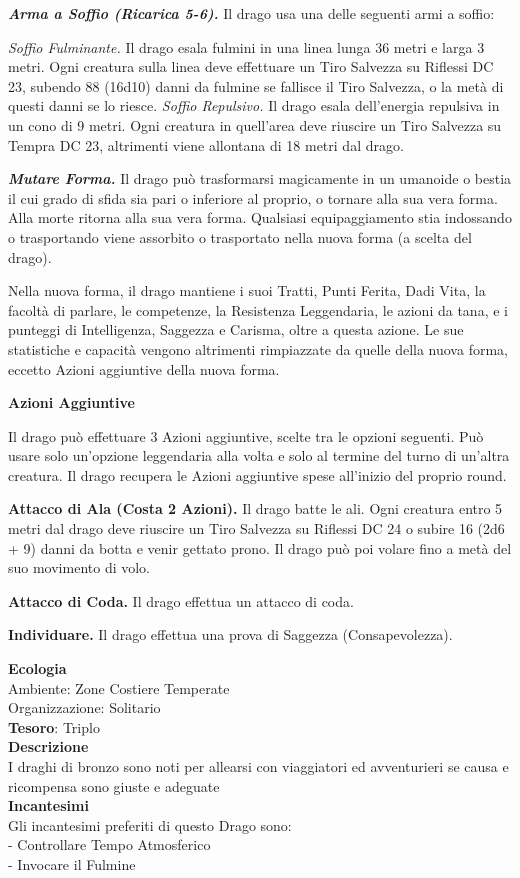 \begin{multicols}{2}
	\textit{\textbf{Arma a Soffio (Ricarica 5-6).}} Il drago usa una delle seguenti armi a soffio:

	\textit{Soffio Fulminante.} Il drago esala fulmini in una linea lunga 36 metri e larga 3 metri. Ogni creatura sulla linea deve effettuare un Tiro Salvezza su Riflessi DC 23, subendo 88 (16d10) danni da fulmine se fallisce il Tiro Salvezza, o la metà di questi danni se lo riesce. \textit{Soffio Repulsivo.} Il drago esala dell'energia repulsiva in un cono di 9 metri. Ogni creatura in quell'area deve riuscire un Tiro Salvezza su Tempra DC 23, altrimenti viene allontana di 18 metri dal
	drago.

	\textit{\textbf{Mutare Forma.}} Il drago può trasformarsi magicamente in un umanoide o bestia il cui grado di sfida sia pari o inferiore al proprio, o tornare alla sua vera forma. Alla morte ritorna alla sua vera forma. Qualsiasi equipaggiamento stia indossando o trasportando viene assorbito o trasportato nella nuova forma (a scelta del drago).

	Nella nuova forma, il drago mantiene i suoi Tratti, Punti Ferita, Dadi Vita, la facoltà di parlare, le competenze, la Resistenza Leggendaria, le azioni da tana, e i punteggi di Intelligenza, Saggezza e Carisma, oltre a questa azione. Le sue statistiche e capacità vengono altrimenti rimpiazzate da quelle della nuova forma, eccetto Azioni aggiuntive della nuova forma.

	\textbf{Azioni Aggiuntive}

	Il drago può effettuare 3 Azioni aggiuntive, scelte tra le opzioni seguenti. Può usare solo un'opzione leggendaria alla volta e solo al termine del turno di un'altra creatura. Il drago recupera le Azioni aggiuntive spese all'inizio del proprio round.

	\textbf{Attacco di Ala (Costa 2 Azioni).} Il drago batte le ali. Ogni creatura entro 5 metri dal drago deve riuscire un Tiro Salvezza su Riflessi DC 24 o subire 16 (2d6 + 9) danni da botta e venir gettato prono. Il drago può poi volare fino a metà del suo movimento di volo.

	\textbf{Attacco di Coda.} Il drago effettua un attacco di coda.

	\textbf{Individuare.} Il drago effettua una prova di Saggezza (Consapevolezza).

	\textbf{Ecologia}\\
	Ambiente: Zone Costiere Temperate\\
	Organizzazione: Solitario\\
	\textbf{Tesoro}: Triplo\\
	\textbf{Descrizione}\\
	I draghi di bronzo sono noti per allearsi con viaggiatori ed avventurieri se causa e ricompensa sono giuste e adeguate\\
	\textbf{Incantesimi}\\
	Gli incantesimi preferiti di questo Drago sono:\\
	- Controllare Tempo Atmosferico\\
	- Invocare il Fulmine



\end{multicols}
